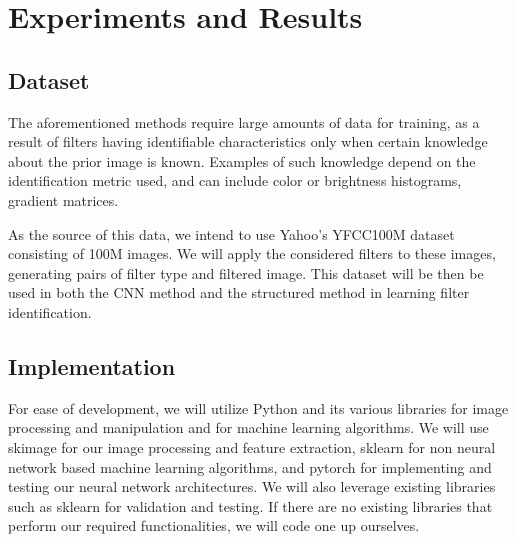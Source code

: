 \documentclass[a4paper, 11pt]{article}
\begin{document}

    


\section*{Experiments and Results}

\subsection*{Dataset}
The aforementioned methods require large amounts of data for training, as a result of filters having identifiable characteristics only when certain knowledge about the prior image is known. Examples of such knowledge depend on the identification metric used, and can include color or brightness histograms, gradient matrices.

As the source of this data, we intend to use Yahoo's YFCC100M dataset \cite{Yahoo} consisting of 100M images. We will apply the considered filters to these images, generating pairs of filter type and filtered image. This dataset will be then be used in both the CNN method and the structured method in learning filter identification.

\subsection*{Implementation}
For ease of development, we will utilize Python and its various libraries for image processing and manipulation and for machine learning algorithms. We will use skimage for our image processing and feature extraction, sklearn for non neural network based machine learning algorithms, and pytorch for implementing and testing our neural network architectures. We will also leverage existing libraries such as sklearn for validation and testing. If there are no existing libraries that perform our required functionalities, we will code one up ourselves. 
\end{document}
